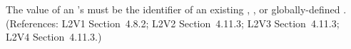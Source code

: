 The value of an \AssignmentRule's  must be the identifier
of an existing \Compartment, \Species, or globally-defined \Parameter.
(References: L2V1 Section~4.8.2; L2V2 Section~4.11.3; L2V3
Section~4.11.3; L2V4 Section~4.11.3.)

